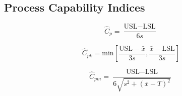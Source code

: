 \documentclass[a4paper,12pt]{article}
\begin{document}
	\subsection*{Process Capability Indices}
	\[ \hat{C}_p = \frac{\mbox{USL} - \mbox{LSL}}{6s}\]
	
	\[ \hat{C}_{pk} = \mbox{min} \left[\frac{\mbox{USL} - \bar{x}}{3s},\frac{\bar{x} - \mbox{LSL}}{3s} \right] \]
	
	\[ \hat{C}_{pm} = \frac{\mbox{USL} - \mbox{LSL}}{6\sqrt{s^2+(\bar{x}-T)^2}}\]
	\bigskip
	
\end{document}

